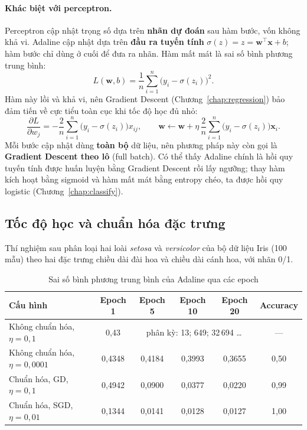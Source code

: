 \paragraph{Khác biệt với perceptron.} Perceptron cập nhật trọng số dựa trên \textbf{nhãn dự đoán} sau hàm bước, vốn không khả vi. Adaline cập nhật dựa trên \textbf{đầu ra tuyến tính} $\sigma(z) = z = \mathbf{w}^\top\mathbf{x} + b$; hàm bước chỉ dùng ở cuối để đưa ra nhãn. Hàm mất mát là sai số bình phương trung bình:
\begin{equation}
    L(\mathbf{w}, b) = \frac{1}{n}\sum_{i=1}^{n}\big(y_i - \sigma(z_i)\big)^2 .
\end{equation}
Hàm này lồi và khả vi, nên Gradient Descent (Chương~\ref{chap:regression}) bảo đảm tiến về cực tiểu toàn cục khi tốc độ học đủ nhỏ:
\begin{equation}
    \frac{\partial L}{\partial w_j} = -\frac{2}{n}\sum_{i=1}^{n}\big(y_i - \sigma(z_i)\big)x_{ij}, \qquad
    \mathbf{w} \leftarrow \mathbf{w} + \eta\,\frac{2}{n}\sum_{i=1}^{n}\big(y_i - \sigma(z_i)\big)\mathbf{x}_i .
\end{equation}
Mỗi bước cập nhật dùng \textbf{toàn bộ} dữ liệu, nên phương pháp này còn gọi là \textbf{Gradient Descent theo lô} (full batch). Có thể thấy Adaline chính là hồi quy tuyến tính được huấn luyện bằng Gradient Descent rồi lấy ngưỡng; thay hàm kích hoạt bằng sigmoid và hàm mất mát bằng entropy chéo, ta được hồi quy logistic (Chương~\ref{chap:classify}).

\subsection{Tốc độ học và chuẩn hóa đặc trưng}

Thí nghiệm sau phân loại hai loài \textit{setosa} và \textit{versicolor} của bộ dữ liệu Iris (100 mẫu) theo hai đặc trưng chiều dài đài hoa và chiều dài cánh hoa, với nhãn 0/1.

\begin{table}[H]
\centering
\begin{tabular}{|l|c|c|c|c|c|}
\hline
\textbf{Cấu hình} & \textbf{Epoch 1} & \textbf{Epoch 5} & \textbf{Epoch 10} & \textbf{Epoch 20} & \textbf{Accuracy} \\
\hline
Không chuẩn hóa, $\eta = 0{,}1$ & 0,43 & \multicolumn{3}{c|}{phân kỳ: 13; 649; 32\,694 \ldots} & --- \\ \hline
Không chuẩn hóa, $\eta = 0{,}0001$ & 0,4348 & 0,4184 & 0,3993 & 0,3655 & 0,50 \\ \hline
Chuẩn hóa, GD, $\eta = 0{,}1$ & 0,4942 & 0,0900 & 0,0377 & 0,0220 & 0,99 \\ \hline
Chuẩn hóa, SGD, $\eta = 0{,}01$ & 0,1344 & 0,0141 & 0,0128 & 0,0127 & 1,00 \\ \hline
\end{tabular}
\caption{Sai số bình phương trung bình của Adaline qua các epoch}
\label{tab:adaline}
\end{table}

